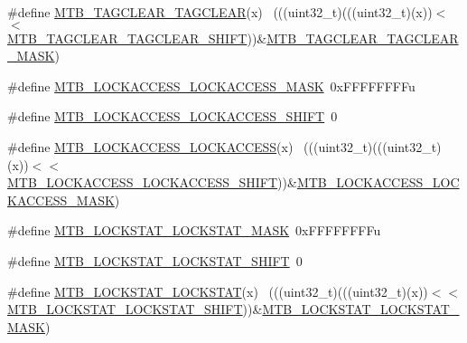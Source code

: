\begin{DoxyCompactItemize}
\item 
\#define \hyperlink{group___m_t_b___register___masks_gad2ffe39d56a859c7554f1fc099584c44}{M\+T\+B\+\_\+\+T\+A\+G\+C\+L\+E\+A\+R\+\_\+\+T\+A\+G\+C\+L\+E\+AR}(x)                              ~(((uint32\+\_\+t)(((uint32\+\_\+t)(x))$<$$<$\hyperlink{group___m_t_b___register___masks_gac1ba97e3448e183a4d00b63060786290}{M\+T\+B\+\_\+\+T\+A\+G\+C\+L\+E\+A\+R\+\_\+\+T\+A\+G\+C\+L\+E\+A\+R\+\_\+\+S\+H\+I\+FT}))\&\hyperlink{group___m_t_b___register___masks_ga50dabf07ab4f88615242b68c0466aab0}{M\+T\+B\+\_\+\+T\+A\+G\+C\+L\+E\+A\+R\+\_\+\+T\+A\+G\+C\+L\+E\+A\+R\+\_\+\+M\+A\+SK})
\item 
\#define \hyperlink{group___m_t_b___register___masks_ga44e6720b612450d08ba896ca1ad61185}{M\+T\+B\+\_\+\+L\+O\+C\+K\+A\+C\+C\+E\+S\+S\+\_\+\+L\+O\+C\+K\+A\+C\+C\+E\+S\+S\+\_\+\+M\+A\+SK}~0x\+F\+F\+F\+F\+F\+F\+F\+Fu
\item 
\#define \hyperlink{group___m_t_b___register___masks_ga7417a26e29a0d9667c59ce74044f210b}{M\+T\+B\+\_\+\+L\+O\+C\+K\+A\+C\+C\+E\+S\+S\+\_\+\+L\+O\+C\+K\+A\+C\+C\+E\+S\+S\+\_\+\+S\+H\+I\+FT}~0
\item 
\#define \hyperlink{group___m_t_b___register___masks_ga616f7f3b45ed60b56f5a5427730a82d5}{M\+T\+B\+\_\+\+L\+O\+C\+K\+A\+C\+C\+E\+S\+S\+\_\+\+L\+O\+C\+K\+A\+C\+C\+E\+SS}(x)                      ~(((uint32\+\_\+t)(((uint32\+\_\+t)(x))$<$$<$\hyperlink{group___m_t_b___register___masks_ga7417a26e29a0d9667c59ce74044f210b}{M\+T\+B\+\_\+\+L\+O\+C\+K\+A\+C\+C\+E\+S\+S\+\_\+\+L\+O\+C\+K\+A\+C\+C\+E\+S\+S\+\_\+\+S\+H\+I\+FT}))\&\hyperlink{group___m_t_b___register___masks_ga44e6720b612450d08ba896ca1ad61185}{M\+T\+B\+\_\+\+L\+O\+C\+K\+A\+C\+C\+E\+S\+S\+\_\+\+L\+O\+C\+K\+A\+C\+C\+E\+S\+S\+\_\+\+M\+A\+SK})
\item 
\#define \hyperlink{group___m_t_b___register___masks_ga8844dcbc4d3c0a3dcbb3ced21e84b950}{M\+T\+B\+\_\+\+L\+O\+C\+K\+S\+T\+A\+T\+\_\+\+L\+O\+C\+K\+S\+T\+A\+T\+\_\+\+M\+A\+SK}~0x\+F\+F\+F\+F\+F\+F\+F\+Fu
\item 
\#define \hyperlink{group___m_t_b___register___masks_ga198cb66f9e01cde28d71dfab52f7b66c}{M\+T\+B\+\_\+\+L\+O\+C\+K\+S\+T\+A\+T\+\_\+\+L\+O\+C\+K\+S\+T\+A\+T\+\_\+\+S\+H\+I\+FT}~0
\item 
\#define \hyperlink{group___m_t_b___register___masks_gaffb429667c6addf1023ea5b2b7fd02a5}{M\+T\+B\+\_\+\+L\+O\+C\+K\+S\+T\+A\+T\+\_\+\+L\+O\+C\+K\+S\+T\+AT}(x)                              ~(((uint32\+\_\+t)(((uint32\+\_\+t)(x))$<$$<$\hyperlink{group___m_t_b___register___masks_ga198cb66f9e01cde28d71dfab52f7b66c}{M\+T\+B\+\_\+\+L\+O\+C\+K\+S\+T\+A\+T\+\_\+\+L\+O\+C\+K\+S\+T\+A\+T\+\_\+\+S\+H\+I\+FT}))\&\hyperlink{group___m_t_b___register___masks_ga8844dcbc4d3c0a3dcbb3ced21e84b950}{M\+T\+B\+\_\+\+L\+O\+C\+K\+S\+T\+A\+T\+\_\+\+L\+O\+C\+K\+S\+T\+A\+T\+\_\+\+M\+A\+SK})
$$
\end{DoxyCompactItemize}
